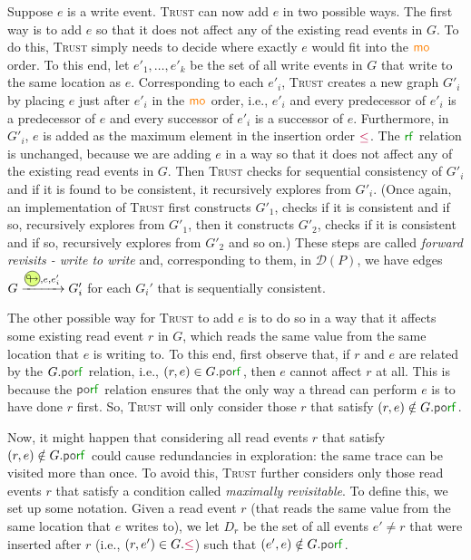 \documentclass[acmsmall]{acmart}
\newcommand{\trust}{\textsc{Trust}\xspace}
\newcommand{\rf}[1]{{\textcolor{green!60!black}{\mathsf{rf}}_{#1}}}
\newcommand{\mo}[1]{{\textcolor{orange}{\mathsf{mo}}_{#1}}}
\newcommand{\porf}[1]{\textcolor{darkgray}{\mathsf{po}\textcolor{green!60!black}{\mathsf{rf}}}_{#1}}
\newcommand{\inord}{\textcolor{purple}\leq}
\newcommand{\fwdtikz}{%
  \tikz[baseline=(char.base)]{
    \node[shape=circle, draw, fill=lime!50, inner sep=0.15pt] (char) {$\looparrowright$};
  }
}
\begin{document}
Suppose $e$ is a write event. \trust can now add $e$ in two possible ways. The first way is to add $e$ so that it does not affect any of the existing read events in $G$.  To do this, \trust simply needs to decide where exactly $e$ would fit into the $\mo{}$ order. To this end, let $e'_1,\dots,e'_k$ be the
set of all write events in $G$ that write to the same location as $e$. Corresponding to each $e'_i$,
\trust creates a new graph $G'_i$ by placing $e$ just after $e'_i$ in the $\mo{}$ order, i.e., $e'_i$ and every predecessor of $e'_i$ is a predecessor of $e$ and every successor of $e'_i$ is a successor of $e$. 
Furthermore, in $G'_i$, $e$ is added as the maximum element in the insertion order $\inord$.
The $\rf{}$ relation is unchanged, because we are adding $e$ in a way so that it does not affect any of the existing read events in $G$. Then \trust checks for sequential consistency of $G'_i$ and if it is found to be consistent, it recursively explores from $G'_i$. (Once again, an implementation of \trust first constructs $G'_1$, checks if it is consistent and if so, recursively explores from $G'_1$, then it constructs $G'_2$, checks if it is consistent and if so, recursively explores from $G'_2$ and so on.) 
These steps are called \emph{forward revisits - write to write} and, corresponding to them, in  $\mathcal{D}(P)$, 
we have edges $G \xrightarrow{\fwdtikz, e, e'_i} G'_i$ for each $G_i'$ that is sequentially consistent. 

The other possible way for \trust to add $e$ is to do so in a way that it affects some existing read event $r$ in $G$, which reads the same value from the same location that $e$ is writing to. To this end, first observe that, if $r$ and $e$ are related by the $G.\porf{}$ relation, i.e., $(r,e) \in G.\porf{}$, then $e$ cannot affect $r$ at all. This is because the $\porf{}$ relation ensures that the only way a thread can perform $e$ is to have done $r$ first. So, \trust will only consider those $r$ that satisfy $(r,e) \notin G.\porf{}$. 

Now, it might happen that considering all read events $r$ that satisfy $(r,e) \notin G.\porf{}$ could cause 
redundancies in exploration: the same trace can be visited more than once. 
To avoid this, \trust further considers only those read events $r$ that satisfy a condition called \emph{maximally revisitable}. To define this, we set up some notation. Given a read event $r$ (that reads the same value from the same location that $e$ writes to), we let $D_r$ be the set of all events $e' \neq r$ that were inserted after $r$ (i.e., $(r,e') \in G.\inord$) such that $(e',e) \notin G.\porf{}$.
\end{document}
